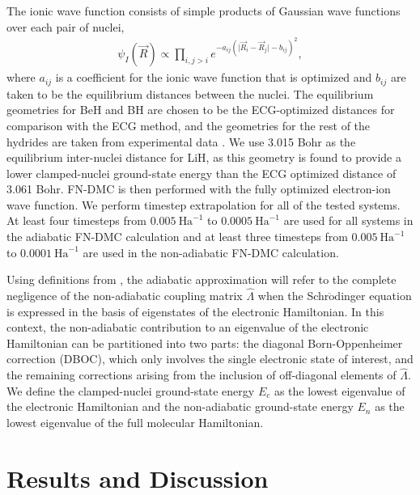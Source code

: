 \documentclass[pra,superscriptaddress,groupedaddress,twocolumn]{revtex4}
\begin{document}
The ionic wave function consists of simple products of Gaussian wave functions over each pair of nuclei,
\begin{align}
\psi_I(\vec{R})\propto \prod\limits_{i,j>i}e^{-a_{ij}(\vert \vec{R}_i-\vec{R}_j\vert-b_{ij})^2},
\label{wfs_ions}
\end{align}
where $a_{ij}$ is a coefficient for the ionic wave function that is optimized and $b_{ij}$ are taken to be the equilibrium distances between the nuclei.  The equilibrium geometries for BeH and BH are chosen to be the ECG-optimized distances for comparison with the ECG method, and the geometries for the rest of the hydrides are taken from experimental data \cite{CCCBDB}. We use 3.015 Bohr as the equilibrium inter-nuclei distance for LiH, as this geometry is found to provide a lower clamped-nuclei ground-state energy than the ECG optimized distance of 3.061 Bohr. FN-DMC is then performed with the fully optimized electron-ion wave function. We perform timestep extrapolation for all of the tested systems. At least four timesteps from $0.005~\text{Ha}^{-1}$ to $0.0005~\text{Ha}^{-1}$ are used for all systems in the adiabatic FN-DMC calculation and at least three timesteps from $0.005~\text{Ha}^{-1}$ to $0.0001~\text{Ha}^{-1}$ are used in the non-adiabatic FN-DMC calculation.

Using definitions from \cite{Cederbaum_Review}, the adiabatic approximation will refer to the complete negligence of the non-adiabatic coupling matrix $\hat{\Lambda}$ when the Schr$\ddot{\text{o}}$dinger equation is expressed in the basis of eigenstates of the electronic Hamiltonian. In this context, the non-adiabatic contribution to an eigenvalue of the electronic Hamiltonian can be partitioned into two parts: the diagonal Born-Oppenheimer correction (DBOC), which only involves the single electronic state of interest, and the remaining corrections arising from the inclusion of off-diagonal elements of $\hat{\Lambda}$. We define the clamped-nuclei ground-state energy $E_c$ as the lowest eigenvalue of the electronic Hamiltonian and the non-adiabatic ground-state energy $E_n$ as the lowest eigenvalue of the full molecular Hamiltonian.

\section{Results and Discussion}


\end{document}
